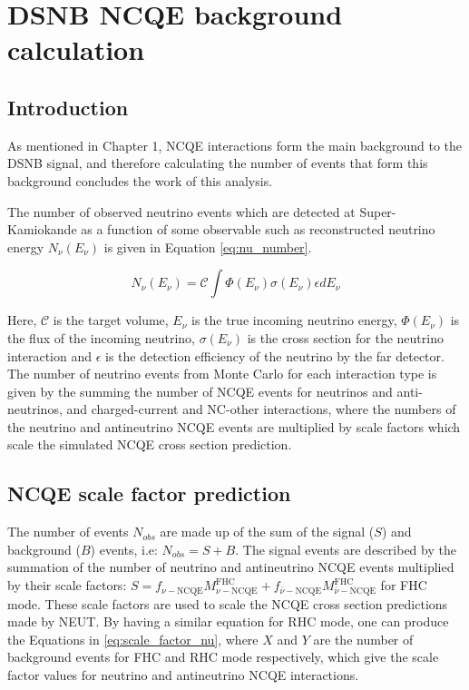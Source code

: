 \chapter{DSNB NCQE background calculation}
\label{chp:ncqe_xsec}


\section{Introduction}

As mentioned in Chapter 1, NCQE interactions form the main background to the DSNB signal, and therefore calculating the number of events that form this background concludes the work of this analysis. 

The number of observed neutrino events which are detected at Super-Kamiokande as a function of some observable such as reconstructed neutrino energy $N_{\nu}(E_{\nu})$ is given in Equation \ref{eq:nu_number}.

\begin{equation}
    N_\nu(E_\nu)=\mathcal{C} \int \Phi\left(E_\nu\right) \sigma\left(E_\nu\right) \epsilon d E_\nu
\label{eq:nu_number}
\end{equation}

Here, $\mathcal{C}$ is the target volume, $E_{\nu}$ is the true incoming neutrino energy, $\Phi(E_{\nu})$ is the flux of the incoming neutrino, $\sigma(E_{\nu})$ is the cross section for the neutrino interaction and $\epsilon$ is the detection efficiency of the neutrino by the far detector. The number of neutrino events from Monte Carlo for each interaction type is given by the summing the number of NCQE events for neutrinos and anti-neutrinos, and charged-current and NC-other interactions, where the numbers of the neutrino and antineutrino NCQE events are multiplied by scale factors which scale the simulated NCQE cross section prediction.


\section{NCQE scale factor prediction}


The number of events $N_{obs}$ are made up of the sum of the signal ($S$) and background ($B$) events, i.e: $N_{obs} = S + B$. The signal events are described by the summation of the number of neutrino and antineutrino NCQE events multiplied by their scale factors: $S  = f_{\nu-\mathrm{NCQE}} M_{\nu-\mathrm{NCQE}}^{\mathrm{FHC}}+f_{\bar{\nu}-\mathrm{NCQE}} M_{\bar{\nu}-\mathrm{NCQE}}^{\mathrm{FHC}}$ for FHC mode. These scale factors are used to scale the NCQE cross section predictions made by NEUT. By having a similar equation for RHC mode, one can produce the Equations in \ref{eq:scale_factor_nu}, where $X$ and $Y$ are the number of background events for FHC and RHC mode respectively, which give the scale factor values for neutrino and antineutrino NCQE interactions. 

